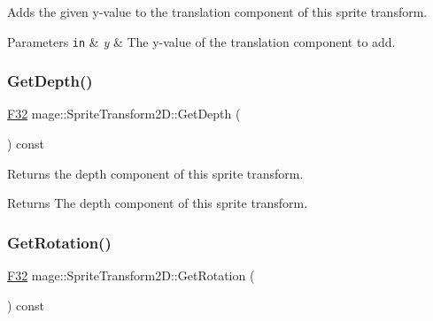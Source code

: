 Adds the given y-\/value to the translation component of this sprite transform.


\begin{DoxyParams}[1]{Parameters}
\mbox{\tt in}  & {\em y} & The y-\/value of the translation component to add. \\
\hline
\end{DoxyParams}
\mbox{\label{classmage_1_1_sprite_transform2_d_a44b63bd121562424086ce444da7d0312}} 
\subsubsection{\texorpdfstring{Get\+Depth()}{GetDepth()}}
{\footnotesize\ttfamily \mbox{\hyperlink{namespacemage_aa97e833b45f06d60a0a9c4fc22ae02c0}{F32}} mage\+::\+Sprite\+Transform2\+D\+::\+Get\+Depth (\begin{DoxyParamCaption}{ }\end{DoxyParamCaption}) const\hspace{0.3cm}{\ttfamily [noexcept]}}

Returns the depth component of this sprite transform.

\begin{DoxyReturn}{Returns}
The depth component of this sprite transform. 
\end{DoxyReturn}
\mbox{\label{classmage_1_1_sprite_transform2_d_ae455373b78cb49a3f75c92eac1f9f3d2}} 
\subsubsection{\texorpdfstring{Get\+Rotation()}{GetRotation()}}
{\footnotesize\ttfamily \mbox{\hyperlink{namespacemage_aa97e833b45f06d60a0a9c4fc22ae02c0}{F32}} mage\+::\+Sprite\+Transform2\+D\+::\+Get\+Rotation (\begin{DoxyParamCaption}{ }\end{DoxyParamCaption}) const\hspace{0.3cm}{\ttfamily [noexcept]}}

